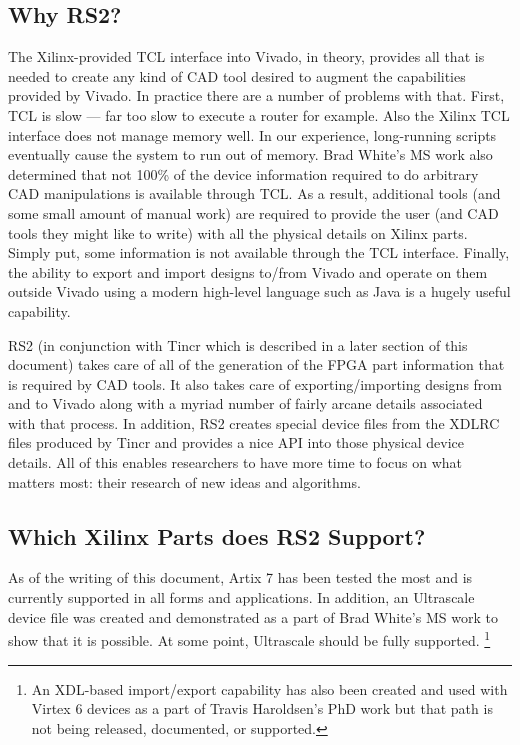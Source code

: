 \documentclass[12pt]{article}
\begin{document}
\subsection{Why RS2?}
The Xilinx-provided TCL interface into Vivado, in theory, provides all that is
needed to create any kind of CAD tool desired to augment the capabilities
provided by Vivado.  In practice there are a number of problems with that.
First, TCL is slow --- far too slow to execute a router for example.  Also the
Xilinx TCL interface does not manage memory well.  In our experience,
long-running scripts eventually cause the system to run out of memory. 
Brad White's MS work also determined
that not 100\% of the device information required to do arbitrary CAD
manipulations is available through TCL.  As a result, additional tools (and
some small amount of manual work) are required to provide the user (and CAD
tools they might like to write) with all the physical details on Xilinx parts.
Simply put, some information is not available through the TCL interface. 
Finally, the ability to export and import designs to/from Vivado and operate
on them outside Vivado using a modern high-level language such as Java is a
hugely useful capability.

RS2 (in conjunction with Tincr which is described in a later section of this
document) takes care of all of the generation of the FPGA part information that
is required by CAD tools. It also takes care of exporting/importing designs from
and to Vivado along with a myriad number of fairly arcane details associated
with that process.  In addition, RS2 creates special device files from the XDLRC
files produced by Tincr and provides a nice API into those physical device
details.  All of this enables researchers to have more time to focus on what
matters most: their research of new ideas and algorithms.

\subsection{Which Xilinx Parts does RS2 Support?}
As of the writing of this document, Artix 7 has been tested the most and is
currently supported in all forms and applications.  In addition, an Ultrascale
device file was created and demonstrated as a part of Brad White's MS work to
show that it is possible.  At some point, Ultrascale should be fully supported.
\footnote{An XDL-based import/export capability has also been created and used
with Virtex 6 devices as a part of Travis Haroldsen's PhD work but that path is
not being released, documented, or supported.}
\end{document}
